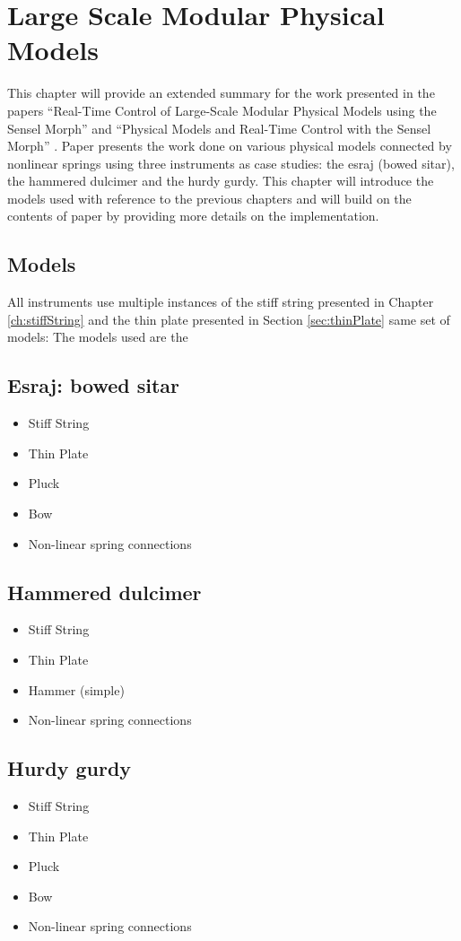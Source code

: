 \chapter{Large Scale Modular Physical Models}\label{ch:largeScale}
This chapter will provide an extended summary for the work presented in the papers ``Real-Time Control of Large-Scale Modular Physical Models using the Sensel Morph'' \citeP[A] and ``Physical Models and Real-Time Control with the Sensel Morph'' \citeP[B]. Paper \citeP[A] presents the work done on various physical models connected by nonlinear springs using three instruments as case studies: the esraj (bowed sitar), the hammered dulcimer and the hurdy gurdy. This chapter will introduce the models used with reference to the previous chapters and will build on the contents of paper \citeP[A] by providing more details on the implementation.

\section{Models}
All instruments use multiple instances of the stiff string presented in Chapter \ref{ch:stiffString} and the thin plate presented in Section \ref{sec:thinPlate} same set of models: The models used are the 

\section{Esraj: bowed sitar}
\begin{itemize}
    \item Stiff String
    \item Thin Plate
    \item Pluck
    \item Bow
    \item Non-linear spring connections
\end{itemize}

\section{Hammered dulcimer}
\begin{itemize}
    \item Stiff String
    \item Thin Plate
    \item Hammer (simple)
    \item Non-linear spring connections
\end{itemize}

\section{Hurdy gurdy}
\begin{itemize}
    \item Stiff String
    \item Thin Plate
    \item Pluck
    \item Bow
    \item Non-linear spring connections
\end{itemize}




